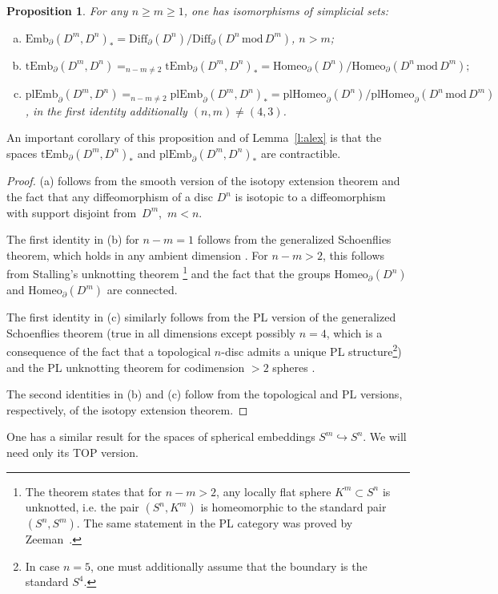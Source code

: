 \documentclass[11pt]{amsart}
\newtheorem{proposition}[theorem]{Proposition}
\theoremstyle{definition}
\newcommand{\Embmn}{\mathrm{Emb}_\partial(D^m,D^n)}
\newcommand{\tEmbmn}{\mathrm{tEmb}_\partial(D^m,D^n)}
\newcommand{\plEmbmn}{\mathrm{plEmb}_\partial(D^m,D^n)}
\newcommand{\Diffn}{\mathrm{Diff}_\partial(D^n)}
\newcommand{\Diff}{\mathrm{Diff}}
\newcommand{\Homeo}{\mathrm{Homeo}}
\newcommand{\plHomeo}{\mathrm{plHomeo}}
\newcommand{\mmod}{\,\mathrm{mod}\,}
\numberwithin{equation}{section}
\begin{document}
\begin{proposition}\label{p:disc_emb}
For any $n\geq m\geq 1$, one has isomorphisms of simplicial sets:
\begin{enumerate}[(a)]
\item $\Embmn_*=\Diffn/\Diff_\partial(D^n\mmod D^m)$, $n>m$;
\item $\tEmbmn=_{n-m\neq 2}\tEmbmn_*=\Homeo_\partial(D^n)/\Homeo_\partial(D^n\mmod D^m);$
\item $\plEmbmn=_{n-m\neq 2}\plEmbmn_*=\plHomeo_\partial(D^n)/\plHomeo_\partial(D^n\mmod D^m)$, in  the first identity additionally $(n,m)\neq (4,3)$.
\end{enumerate}
\end{proposition}

An important corollary of this proposition  and of Lemma~\ref{l:alex} is that the spaces $\tEmbmn_*$ and $\plEmbmn_*$ are contractible.

\begin{proof}
(a) follows from the smooth version of the isotopy extension theorem and the fact that any diffeomorphism of a disc $D^n$ is isotopic to a diffeomorphism
with support disjoint from~$D^m$,~$m<n$.

The first identity in (b) for $n-m=1$ follows from the generalized Schoenflies theorem, which holds in any ambient dimension \cite{Brown,Mazur,Morse}. For $n-m>2$, this follows
from Stalling's unknotting theorem \cite{Stallings,Brakes}\footnote{The theorem states that for $n-m>2$, any locally flat sphere $K^{m}\subset S^n$ is unknotted, i.e. the pair $(S^n,K^m)$ is homeomorphic to the standard pair  $(S^n,S^m)$. The same statement in the PL category was proved by Zeeman~\cite{Zeeman}.} and the fact that the groups $\Homeo_\partial(D^n)$ and 
$\Homeo_\partial(D^m)$ are connected.

The first identity in (c) similarly follows from the PL version of the generalized Schoenflies theorem (true in all dimensions except possibly $n=4$, which is a consequence of the fact that a topological $n$-disc
admits a unique PL structure\footnote{In case $n=5$, one must additionally assume that the boundary is the standard $S^4$.}) and the
PL unknotting theorem for codimension $>2$ spheres \cite{Zeeman}.

 The second identities in (b) and (c) follow from the topological and PL versions, respectively, of the isotopy extension theorem.
\end{proof}

One has a similar result for the spaces of spherical embeddings $S^m\hookrightarrow S^n$. We will need only its TOP version.
\end{document}
